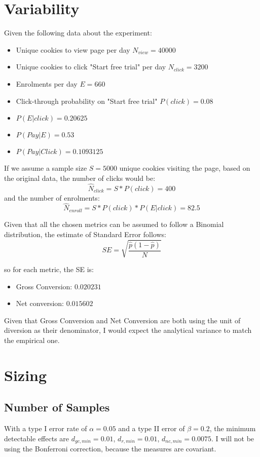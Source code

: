 \documentclass[12pt,a4paper]{article}
\begin{document}
\section{Variability}
Given the following data about the experiment:
\begin{itemize}
\item Unique cookies to view page per day $N_{view} = 40000$
\item Unique cookies to click "Start free trial" per day $N_{click} = 3200$
\item Enrolments per day $E = 660$
\item Click-through probability on "Start free trial" $P(click) = 0.08$
\item $P(E|click) = 0.20625$
\item $P(Pay|E) = 0.53$
\item $P(Pay|Click) = 0.1093125$
\end{itemize}

If we assume a sample size $S = 5000$ unique cookies visiting the page, based on
the original data, the number of clicks would be:
\begin{equation}
\hat{N}_{click} = S * P(click) = 400
\end{equation}
and the number of enrolments:
\begin{equation}
\hat{N}_{enroll} = S * P(click) * P(E|click) = 82.5
\end{equation}


Given that all the chosen metrics can be assumed to follow a Binomial
distribution, the estimate of Standard Error follows:
\begin{equation}
SE = \sqrt{\frac{\hat{p}(1-\hat{p})}{N}}
\end{equation}

so for each metric, the SE is:
\begin{itemize}
\item Gross Conversion: $0.020231$
\item Net conversion: $0.015602$
\end{itemize}

Given that Gross Conversion and Net Conversion are both using the unit of
diversion as their denominator, I would expect the analytical variance to match
the empirical one.

\section{Sizing}
\subsection{Number of Samples}
With a type I error rate of $\alpha=0.05$ and a type II error of $\beta = 0.2$,
the minimum detectable effects are $d_{gc,min} = 0.01$, $d_{r,min} = 0.01$,
$d_{nc,min} = 0.0075$.
I will not be using the Bonferroni correction, because the measures are
covariant.
\end{document}
